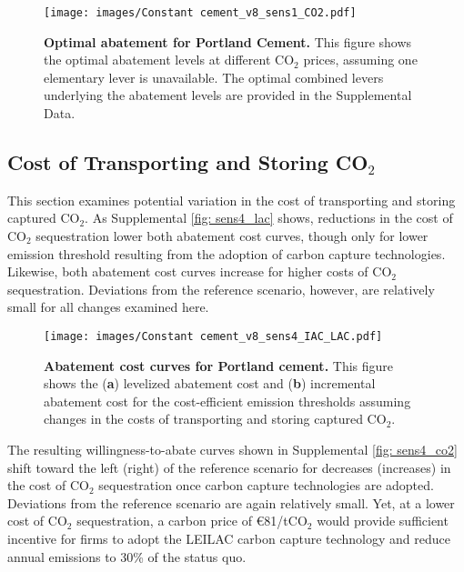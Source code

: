 \documentclass[12pt, a4paper]{article} %
\newcommand{\Suppl}{Supplemental}
\begin{document}
\begin{figure}[ht]
\centering
\texttt{[image: images/Constant cement\_v8\_sens1\_CO2.pdf]}
\caption{\textbf{Optimal abatement for Portland Cement.} This figure shows the optimal abatement levels at different CO$_2$ prices, assuming one elementary lever is unavailable. The optimal combined levers underlying the abatement levels are provided in the \Suppl$ $ Data.}
\label{fig: sens1_value}
\end{figure}


\newpage
\subsection{Cost of Transporting and Storing CO$_2$}
\label{sec: sn-co2}

This section examines potential variation in the cost of transporting and storing captured CO$_2$. As \Suppl$ $ \autoref{fig: sens4_lac} shows, reductions in the cost of CO$_2$ sequestration lower both abatement cost curves, though only for lower emission threshold resulting from the adoption of carbon capture technologies. Likewise, both abatement cost curves increase for higher costs of CO$_2$ sequestration. Deviations from the reference scenario, however, are relatively small for all changes examined here.

\begin{figure}[ht]
\centering
\texttt{[image: images/Constant cement\_v8\_sens4\_IAC\_LAC.pdf]}
\caption{\textbf{Abatement cost curves for Portland cement.} This figure shows the (\textbf{a}) levelized abatement cost and (\textbf{b}) incremental abatement cost for the cost-efficient emission thresholds assuming changes in the costs of transporting and storing captured CO$_2$.}
\label{fig: sens4_lac}
\end{figure}

The resulting willingness-to-abate curves shown in \Suppl$ $ \autoref{fig: sens4_co2} shift toward the left (right) of the reference scenario for decreases (increases) in the cost of CO$_2$ sequestration once carbon capture technologies are adopted. Deviations from the reference scenario are again relatively small. Yet, at a lower cost of CO$_2$ sequestration, a carbon price of \euro81/tCO$_2$ would provide sufficient incentive for firms to adopt the LEILAC carbon capture technology and reduce annual emissions to 30\% of the status quo.
\end{document}
